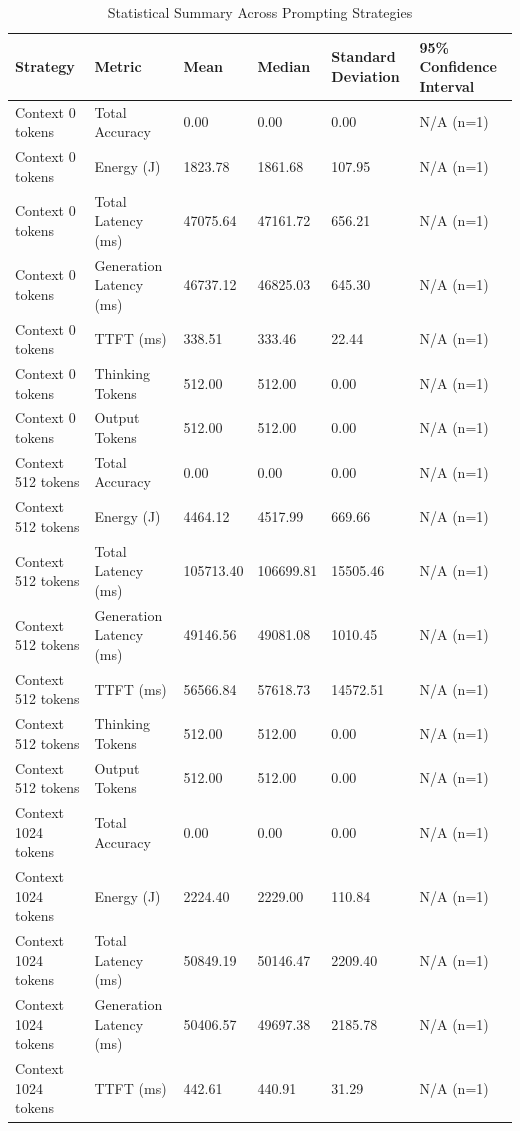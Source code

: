 \begin{table}
\caption{Statistical Summary Across Prompting Strategies}
\label{tab:statistical_summary}
\begin{tabular}{llllll}
\toprule
Strategy & Metric & Mean & Median & Standard Deviation & 95\% Confidence Interval \\
\midrule
Context 0 tokens & Total Accuracy & 0.00 & 0.00 & 0.00 & N/A (n=1) \\
Context 0 tokens & Energy (J) & 1823.78 & 1861.68 & 107.95 & N/A (n=1) \\
Context 0 tokens & Total Latency (ms) & 47075.64 & 47161.72 & 656.21 & N/A (n=1) \\
Context 0 tokens & Generation Latency (ms) & 46737.12 & 46825.03 & 645.30 & N/A (n=1) \\
Context 0 tokens & TTFT (ms) & 338.51 & 333.46 & 22.44 & N/A (n=1) \\
Context 0 tokens & Thinking Tokens & 512.00 & 512.00 & 0.00 & N/A (n=1) \\
Context 0 tokens & Output Tokens & 512.00 & 512.00 & 0.00 & N/A (n=1) \\
Context 512 tokens & Total Accuracy & 0.00 & 0.00 & 0.00 & N/A (n=1) \\
Context 512 tokens & Energy (J) & 4464.12 & 4517.99 & 669.66 & N/A (n=1) \\
Context 512 tokens & Total Latency (ms) & 105713.40 & 106699.81 & 15505.46 & N/A (n=1) \\
Context 512 tokens & Generation Latency (ms) & 49146.56 & 49081.08 & 1010.45 & N/A (n=1) \\
Context 512 tokens & TTFT (ms) & 56566.84 & 57618.73 & 14572.51 & N/A (n=1) \\
Context 512 tokens & Thinking Tokens & 512.00 & 512.00 & 0.00 & N/A (n=1) \\
Context 512 tokens & Output Tokens & 512.00 & 512.00 & 0.00 & N/A (n=1) \\
Context 1024 tokens & Total Accuracy & 0.00 & 0.00 & 0.00 & N/A (n=1) \\
Context 1024 tokens & Energy (J) & 2224.40 & 2229.00 & 110.84 & N/A (n=1) \\
Context 1024 tokens & Total Latency (ms) & 50849.19 & 50146.47 & 2209.40 & N/A (n=1) \\
Context 1024 tokens & Generation Latency (ms) & 50406.57 & 49697.38 & 2185.78 & N/A (n=1) \\
Context 1024 tokens & TTFT (ms) & 442.61 & 440.91 & 31.29 & N/A (n=1) \\

\end{tabular}
\end{table}
